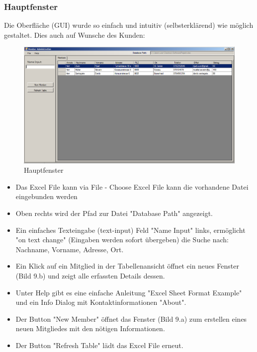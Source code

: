 \documentclass{article}
\begin{document}
\subsubsection{Hauptfenster}
Die Oberfläche (GUI) wurde so einfach und intuitiv (selbsterklärend) wie möglich gestaltet. Dies auch auf Wunsche des Kunden:
\begin{figure}[h]
	\centering
	\includegraphics[width=1.0 \textwidth]{MainGUI}
	\caption{Hauptfenster}
\end{figure}

\begin{itemize}

		\item Das Excel File kann via File - Choose Excel File kann die vorhandene Datei eingebunden werden
		\item Oben rechts wird der Pfad zur Datei "Database Path" angezeigt.
		\item Ein einfaches Texteingabe (text-input) Feld "Name Input" links, ermöglicht "on text change" (Eingaben werden sofort übergeben) die Suche nach: Nachname, Vorname, Adresse, Ort.
		\item Ein Klick auf ein Mitglied in der Tabellenansicht öffnet ein neues Fenster (Bild 9.b) und zeigt alle erfassten Details dessen.
		\item Unter Help gibt es eine einfache Anleitung "Excel Sheet Format Example" und ein Info Dialog mit Kontaktinformationen "About".
		\item Der Button "New Member" öffnet das Fenster (Bild 9.a) zum erstellen eines neuen Mitgliedes mit den nötigen Informationen.
		\item Der Button "Refresh Table" lädt das Excel File erneut.
	 \end{itemize}



\newpage
\end{document}
